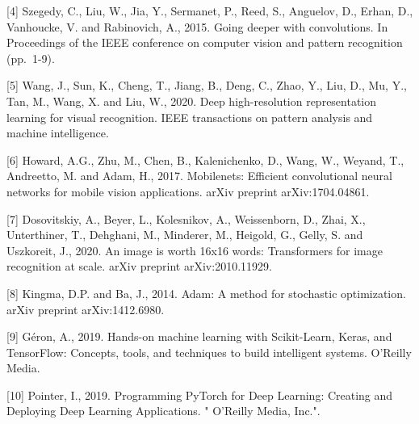 \documentclass[11pt]{article}
\begin{document}
{[}4{]} Szegedy, C., Liu, W., Jia, Y., Sermanet, P., Reed, S., Anguelov,
D., Erhan, D., Vanhoucke, V. and Rabinovich, A., 2015. Going deeper with
convolutions. In Proceedings of the IEEE conference on computer vision
and pattern recognition (pp.~1-9).

{[}5{]} Wang, J., Sun, K., Cheng, T., Jiang, B., Deng, C., Zhao, Y.,
Liu, D., Mu, Y., Tan, M., Wang, X. and Liu, W., 2020. Deep
high-resolution representation learning for visual recognition. IEEE
transactions on pattern analysis and machine intelligence.

{[}6{]} Howard, A.G., Zhu, M., Chen, B., Kalenichenko, D., Wang, W.,
Weyand, T., Andreetto, M. and Adam, H., 2017. Mobilenets: Eﬀicient
convolutional neural networks for mobile vision applications. arXiv
preprint arXiv:1704.04861.

{[}7{]} Dosovitskiy, A., Beyer, L., Kolesnikov, A., Weissenborn, D.,
Zhai, X., Unterthiner, T., Dehghani, M., Minderer, M., Heigold, G.,
Gelly, S. and Uszkoreit, J., 2020. An image is worth 16x16 words:
Transformers for image recognition at scale. arXiv preprint
arXiv:2010.11929.

{[}8{]} Kingma, D.P. and Ba, J., 2014. Adam: A method for stochastic
optimization. arXiv preprint arXiv:1412.6980.

{[}9{]} Géron, A., 2019. Hands-on machine learning with Scikit-Learn,
Keras, and TensorFlow: Concepts, tools, and techniques to build
intelligent systems. O'Reilly Media.

{[}10{]} Pointer, I., 2019. Programming PyTorch for Deep Learning:
Creating and Deploying Deep Learning Applications. " O'Reilly Media,
Inc.".


    
    
    
\end{document}
